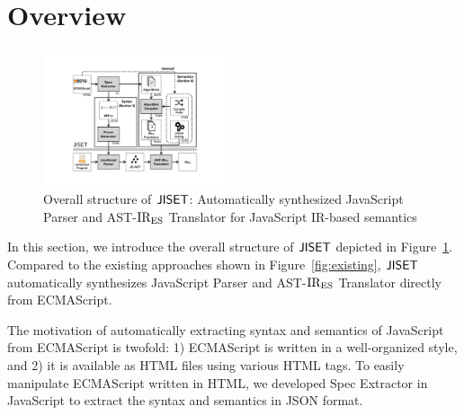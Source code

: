 \section{Overview}
\begin{figure}
  \centering
  \includegraphics[width=0.48\textwidth]{img/overview.pdf}
  \caption{Overall structure of \( \text{\sf JISET} \): Automatically synthesized {\sf
    JavaScript Parser} and {\sf AST-\( \text{IR}_\text{ES} \) Translator} for JavaScript
    IR-based semantics}
  \label{fig:overview}
\vspace*{-1em}
\end{figure}

In this section, we introduce the overall structure of \( \text{\sf JISET} \)
depicted in Figure~\ref{fig:overview}.
Compared to the existing approaches shown in
Figure~\ref{fig:existing}, \( \text{\sf JISET} \) automatically synthesizes
{\sf JavaScript Parser} and {\sf AST-\( \text{IR}_\text{ES} \) Translator} directly from
ECMAScript.

The motivation of automatically extracting syntax and semantics of JavaScript
from ECMAScript is twofold: 1) ECMAScript is written in a well-organized
style, and 2) it is available as HTML files using various HTML tags.
To easily manipulate ECMAScript written in HTML, we developed
{\sf Spec Extractor} in JavaScript to extract the syntax and semantics in JSON format.


